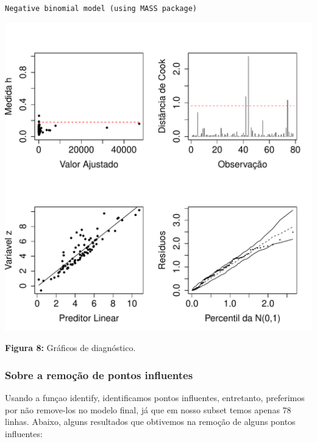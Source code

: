 \documentclass[12pt,a4paper]{article}\usepackage[]{graphicx}\usepackage[]{color}
\makeatletter
\def\maxwidth{ %
  \ifdim\Gin@nat@width>\linewidth
    \linewidth
  \else
    \Gin@nat@width
  \fi
}
\newenvironment{kframe}{%
 \def\at@end@of@kframe{}%
 \ifinner\ifhmode%
  \def\at@end@of@kframe{\end{minipage}}%
  \begin{minipage}{\columnwidth}%
 \fi\fi%
 \def\FrameCommand##1{\hskip\@totalleftmargin \hskip-\fboxsep
 \colorbox{shadecolor}{##1}\hskip-\fboxsep
     \hskip-\linewidth \hskip-\@totalleftmargin \hskip\columnwidth}%
 \MakeFramed {\advance\hsize-\width
   \@totalleftmargin\z@ \linewidth\hsize
   \@setminipage}}%
 {\par\unskip\endMakeFramed%
 \at@end@of@kframe}
\newenvironment{knitrout}{}{} %
\makeatother
\begin{document}
\begin{knitrout}
\color{fgcolor}\begin{kframe}
\begin{verbatim}
Negative binomial model (using MASS package) 
\end{verbatim}
\end{kframe}
\includegraphics[width=\maxwidth]{figure/unnamed-chunk-18-1} 

\end{knitrout}
\textbf{Figura 8:} Gráficos de diagnóstico.

\subsubsection{\textbf{Sobre a remoção de pontos influentes}}
Usando a funçao identify, identificamos pontos influentes, entretanto, preferimos por não remove-los no modelo final, já que em nosso subset temos apenas $78$ linhas.
Abaixo, alguns resultados que obtivemos na remoção de alguns pontos influentes:
\end{document}
